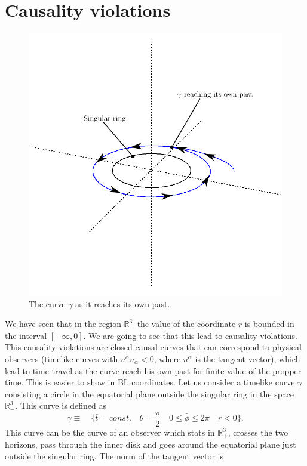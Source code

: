 \section{Causality violations}
\begin{figure}
\begin{center}
 \centerline{\includegraphics[width=.75\textwidth]{img/Chapter2/causal.png}}
 \end{center}
 \vspace{-1cm}
 \caption{The curve $\gamma$ as it reaches its own past.}
 \label{fig:pastgamm}
\end{figure} 
We have seen that in the region $\mathbb{R}_{-}^3$ the value of the coordinate $r$ is bounded in the interval $[-\infty,0]$. We are going to see that this lead to causality violations. This causality violations are closed causal curves that can correspond to physical observers (timelike curves with $u^\alpha u_\alpha<0$, where $u^\alpha$ is the tangent vector), which lead to time travel as the curve reach his own past for finite value of the propper time. This is easier to show in \gls{BL} coordinates. Let us consider a timelike curve $\gamma$ consisting a circle in the equatorial plane outside the singular ring in the space $\mathbb{R}_{-}^3$. This curve is defined as
\begin{equation}
 \gamma \equiv \quad \{ \bar{t}=const. \quad \theta=\frac{\pi}{2} \quad 0 \leq \bar{\phi} \leq 2 \pi \quad r<0\}.
\end{equation}
This curve can be the curve of an observer which stats in $\mathbb{R}_{+}^3$, crosses the two horizons, pass through the inner disk and goes around the equatorial plane just outside the singular ring. The norm of the tangent vector is
